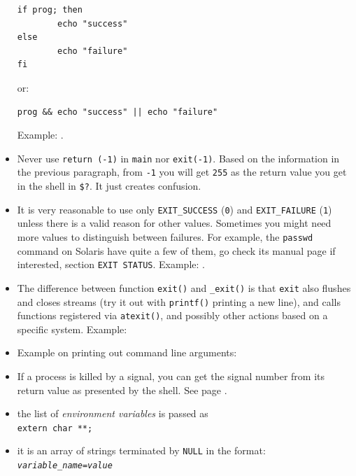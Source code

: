 \begin{itemize}
\begin{verbatim}
if prog; then
        echo "success"
else
        echo "failure"
fi
\end{verbatim}

or:

\begin{verbatim}
prog && echo "success" || echo "failure"
\end{verbatim}
Example: .
\item \label{RETURN255} Never use \texttt{return (-1)} in \texttt{main} nor
\texttt{exit(-1)}.  Based on the information in the previous paragraph,
from \texttt{-1} you will get \texttt{255} as the return value you get in the
shell in \texttt{\$?}.  It just creates confusion.
\item It is very reasonable to use only \texttt{EXIT\_SUCCESS} (\texttt{0}) and
\texttt{EXIT\_FAILURE} (\texttt{1}) unless there is a valid reason for other
values.  Sometimes you might need more values to distinguish between failures.
For example, the \texttt{passwd} command on Solaris have quite a few of them, go
check its manual page if interested, section \texttt{EXIT STATUS}. Example:
.
\item The difference between function \texttt{exit()} and \verb#_exit()# is that
\texttt{exit} also flushes and closes streams (try it out with \texttt{printf()}
 printing a new line), and calls functions registered via
\texttt{atexit()}, and possibly other actions based on a specific system.
Example: 
\item \label{MAIN_C} Example on printing out command line arguments:
\item If a process is killed by a signal, you can get the signal number from its
return value as presented by the shell.  See page
\pageref{SHELLRETVALUEFORSIGNALS}.
\end{itemize}


\begin{slide}
\begin{itemize}
\item the list of \emph{environment
variables} is passed as\\ \texttt{extern char
**;}
\item it is an array of strings terminated by \texttt{NULL} in the
format: \texttt{\emph{variable\_name}=\emph{value}}
\end{itemize}
\begin{center}

\end{center}
\end{slide}

